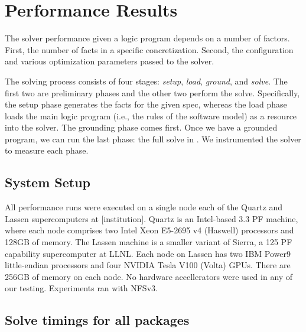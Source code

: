 \section{Performance Results}
\label{sec:perf-results}


The \clingo{} solver performance given a logic program depends on a number of factors.
First, the number of facts in a specific concretization. Second, the configuration and
various optimization parameters passed to the solver.

The solving process consists of four stages: \emph{setup}, \emph{load}, \emph{ground},
and \emph{solve}. The first two are preliminary phases and the other two perform the
solve. Specifically, the setup phase generates the facts for the given spec,
whereas the load phase loads the main logic program (i.e., the rules of the
software model) as a resource into the solver. The grounding phase comes first. Once we
have a grounded program, we can run the last phase: the full solve in \clingo{}.
%
We instrumented the solver to measure each phase.

% 

% 



\subsection{System Setup}

All performance runs were executed on a single node each of the Quartz and Lassen
supercomputers at [institution].
Quartz is an Intel-based 3.3 PF machine, where each node comprises two Intel Xeon
E5-2695 v4 (Haswell) processors and 128GB of memory. The Lassen machine is a smaller
variant of Sierra, a 125 PF capability supercomputer at LLNL. Each node on Lassen has
two IBM Power9 little-endian processors and four NVIDIA Tesla V100 (Volta) GPUs. There
are 256GB of memory on each node. No hardware accellerators were used in any of our
testing. Experiments ran with NFSv3.

\subsection{Solve timings for all packages}

